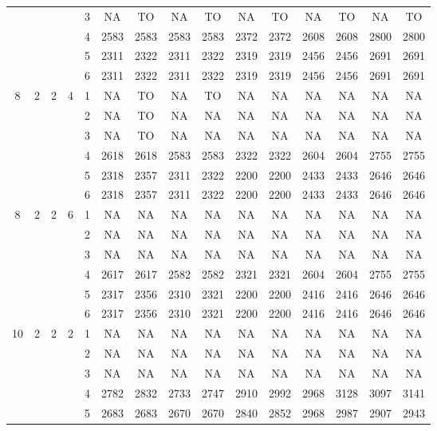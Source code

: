 \begin{longtable}{|c|c|c|c|c|c c|c c|c c|c c|c c|}
 & & & & 3 & NA & TO & NA & TO & NA & TO & NA & TO & NA & TO \\
 & & & & 4 & 2583 & 2583 & 2583 & 2583 & 2372 & 2372 & 2608 & 2608 & 2800 & 2800 \\
 & & & & 5 & 2311 & 2322 & 2311 & 2322 & 2319 & 2319 & 2456 & 2456 & 2691 & 2691 \\
 & & & & 6 & 2311 & 2322 & 2311 & 2322 & 2319 & 2319 & 2456 & 2456 & 2691 & 2691 \\
\hline
\multirow{6}{*}{8} & \multirow{6}{*}{2} & \multirow{6}{*}{2} & \multirow{6}{*}{4} & 1 & NA & TO & NA & TO & NA & NA & NA & NA & NA & NA \\
 & & & & 2 & NA & TO & NA & NA & NA & NA & NA & NA & NA & NA \\
 & & & & 3 & NA & TO & NA & NA & NA & NA & NA & NA & NA & NA \\
 & & & & 4 & 2618 & 2618 & 2583 & 2583 & 2322 & 2322 & 2604 & 2604 & 2755 & 2755 \\
 & & & & 5 & 2318 & 2357 & 2311 & 2322 & 2200 & 2200 & 2433 & 2433 & 2646 & 2646 \\
 & & & & 6 & 2318 & 2357 & 2311 & 2322 & 2200 & 2200 & 2433 & 2433 & 2646 & 2646 \\
\hline
\multirow{6}{*}{8} & \multirow{6}{*}{2} & \multirow{6}{*}{2} & \multirow{6}{*}{6} & 1 & NA & NA & NA & NA & NA & NA & NA & NA & NA & NA \\
 & & & & 2 & NA & NA & NA & NA & NA & NA & NA & NA & NA & NA \\
 & & & & 3 & NA & NA & NA & NA & NA & NA & NA & NA & NA & NA \\
 & & & & 4 & 2617 & 2617 & 2582 & 2582 & 2321 & 2321 & 2604 & 2604 & 2755 & 2755 \\
 & & & & 5 & 2317 & 2356 & 2310 & 2321 & 2200 & 2200 & 2416 & 2416 & 2646 & 2646 \\
 & & & & 6 & 2317 & 2356 & 2310 & 2321 & 2200 & 2200 & 2416 & 2416 & 2646 & 2646 \\
\hline
\multirow{6}{*}{10} & \multirow{6}{*}{2} & \multirow{6}{*}{2} & \multirow{6}{*}{2} & 1 & NA & NA & NA & NA & NA & NA & NA & NA & NA & NA \\
 & & & & 2 & NA & NA & NA & NA & NA & NA & NA & NA & NA & NA \\
 & & & & 3 & NA & NA & NA & NA & NA & NA & NA & NA & NA & NA \\
 & & & & 4 & 2782 & 2832 & 2733 & 2747 & 2910 & 2992 & 2968 & 3128 & 3097 & 3141 \\
 & & & & 5 & 2683 & 2683 & 2670 & 2670 & 2840 & 2852 & 2968 & 2987 & 2907 & 2943 \\

\end{longtable}
